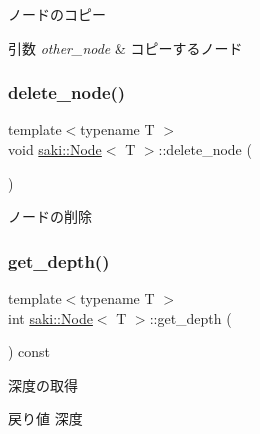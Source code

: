 ノードのコピー 


\begin{DoxyParams}{引数}
{\em other\+\_\+node} & コピーするノード \\
\hline
\end{DoxyParams}
\mbox{\label{classsaki_1_1_node_a57d63d7ba5c2f3bba02a042bbad12dc4}} 
\subsubsection{\texorpdfstring{delete\+\_\+node()}{delete\_node()}}
{\footnotesize\ttfamily template$<$typename T $>$ \\
void \mbox{\hyperlink{classsaki_1_1_node}{saki\+::\+Node}}$<$ T $>$\+::delete\+\_\+node (\begin{DoxyParamCaption}{ }\end{DoxyParamCaption})\hspace{0.3cm}{\ttfamily [inline]}}



ノードの削除 

\mbox{\label{classsaki_1_1_node_a8351b7ef227bc1f97f4d82748d6aa2a3}} 
\subsubsection{\texorpdfstring{get\+\_\+depth()}{get\_depth()}}
{\footnotesize\ttfamily template$<$typename T $>$ \\
int \mbox{\hyperlink{classsaki_1_1_node}{saki\+::\+Node}}$<$ T $>$\+::get\+\_\+depth (\begin{DoxyParamCaption}{ }\end{DoxyParamCaption}) const\hspace{0.3cm}{\ttfamily [inline]}}



深度の取得 

\begin{DoxyReturn}{戻り値}
深度 
\end{DoxyReturn}
\mbox{\label{classsaki_1_1_node_ab0daef362cc404496f170b3ef0a355f0}} 
